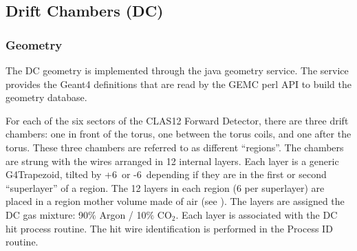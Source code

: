 \subsection{Drift Chambers (DC)}

\subsubsection{Geometry}

The DC geometry is implemented through the java geometry service.
The service provides the Geant4 definitions that are read by the GEMC perl API to build the geometry database.

For each of the six sectors of the CLAS12 Forward Detector, there are three drift chambers: one in front of the torus,
one between the torus coils, and one after the torus.  These three chambers are referred to as different ``regions''.
The chambers are strung with the wires arranged in 12 internal layers.
Each layer is a generic G4Trapezoid, tilted by +6\mdeg \ or -6\mdeg \ depending if they are in the first or second
``superlayer'' of a region.
The 12 layers in each region (6 per superlayer) are placed in a region mother volume made of air (see ).
The layers are assigned the DC gas mixture: 90$\%$ Argon / 10$\%$ CO$_2$. Each layer is associated with the DC hit process routine.
The hit wire identification is performed in the Process ID routine.

